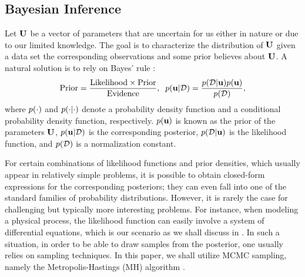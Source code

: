 \subsection{Bayesian Inference} 
Let $\mathbf{U}$ be a vector of parameters that are uncertain for us either in nature or due to our limited knowledge. The goal is to characterize the distribution of $\mathbf{U}$ given a data set the corresponding observations and some prior believes about $\mathbf{U}$. A natural solution is to rely on Bayes' rule \cite{gelman2004}:
\begin{equation} \elabel{bayes}
  \text{Prior} = \frac{\text{Likelihood} \times \text{Prior}}{\text{Evidence}}, \;\; \f{\vu | \data} = \frac{\f{\data | \vu} \f{\vu}}{\f{\data}},
\end{equation}
where $\f{\cdot}$ and $\f{\cdot | \cdot}$ denote a probability density function and a conditional probability density function, respectively. $\f{\vu}$ is known as the prior of the parameters $\mathbf{U}$, $\f{\vu | \data}$ is the corresponding posterior, $\f{\data | \vu}$ is the likelihood function, and $\f{\data}$ is a normalization constant.

For certain combinations of likelihood functions and prior densities, which usually appear in relatively simple problems, it is possible to obtain closed-form expressions for the corresponding posteriors; they can even fall into one of the standard families of probability distributions. However, it is rarely the case for challenging but typically more interesting problems. For instance, when modeling a physical process, the likelihood function can easily involve a system of differential equations, which is our scenario as we shall discuss in . In such a situation, in order to be able to draw samples from the posterior, one usually relies on sampling techniques. In this paper, we shall utilize MCMC sampling, namely the Metropolis-Hastings (MH) algorithm \cite{gelman2004}.

